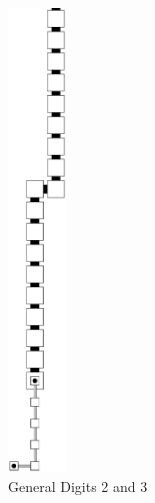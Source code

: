 \begin{itemize}
\begin{figure}[H]
\begin{subfigure}[t]{0.17\textwidth}
                \includegraphics[width=0.17\textwidth]{warping/post_warp_general_digit2and3}
                \caption{\label{fig:post_warp_general_digit2and3} General Digits 2 and 3 }
            \end{subfigure}%
            ~
            \begin{subfigure}[t]{0.17\textwidth}
                \centering

\end{subfigure}
\end{figure}
\end{itemize}
